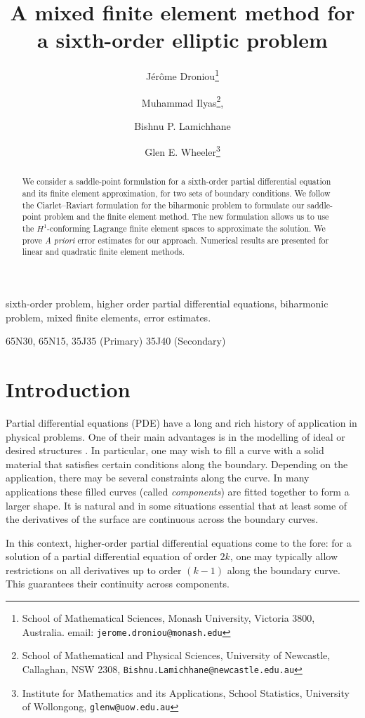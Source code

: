 \documentclass[a4paper,final]{siamltex}
\title{A mixed finite element method for a sixth-order elliptic problem }
\author{J\'er\^ome Droniou\thanks{School of Mathematical Sciences,
Monash University, Victoria 3800, Australia. email: \texttt{jerome.droniou@monash.edu}} 
\and Muhammad Ilyas\footnotemark[2]\thanks{School of Mathematical and Physical Sciences, University of Newcastle, 
Callaghan, NSW 2308,  {\tt Bishnu.Lamichhane@newcastle.edu.au}},
\and  Bishnu P. Lamichhane\footnotemark[2]
\and 
Glen  E. Wheeler\thanks{Institute for Mathematics and its Applications, School
  Statistics, University of Wollongong, 
{\tt glenw@uow.edu.au}}
}
\begin{document}
\maketitle

\begin{abstract}%
We consider a saddle-point formulation  
for a sixth-order partial differential equation and its 
finite element approximation, for two sets of boundary conditions.  
We follow the Ciarlet--Raviart formulation for the biharmonic 
problem to formulate our saddle-point problem and the 
finite element method. The new formulation allows us to use the $H^1$-conforming 
Lagrange finite element spaces to approximate the solution.  
We prove \emph{A priori} error estimates for our approach.
Numerical results are presented for linear and quadratic finite element methods. 

\end{abstract}%

\begin{keywords}
sixth-order problem,  higher order partial differential equations, 
biharmonic problem, mixed finite elements, error estimates.
\end{keywords}

\begin{AMS}
65N30, 65N15, 35J35 (Primary) 35J40 (Secondary)
\end{AMS}

\pagestyle{myheadings}
\thispagestyle{plain}

\section{Introduction}%

Partial differential equations (PDE) have a long and rich history of application in physical
problems.
One of their main advantages is in the modelling of ideal or desired structures \cite{you2004pde}.
In particular, one may wish to fill a curve with a solid material that satisfies certain
conditions along the boundary.
Depending on the application, there may be several constraints along the curve.
In many applications these filled curves (called \emph{components}) are fitted together to
form a larger shape.
It is natural and in some situations essential  that at least some of the derivatives of the
surface are continuous across the boundary curves.

In this context,  higher-order partial differential equations come to the fore:
for a solution of a partial differential equation of order $2k$, one may typically allow
restrictions on all derivatives up to order $(k-1)$ along the boundary curve.
This guarantees their continuity across components.
\end{document}
